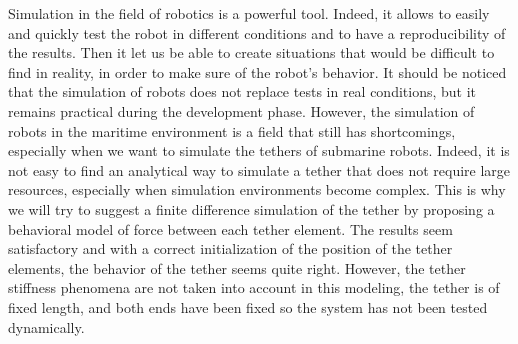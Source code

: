Simulation in the field of robotics is a powerful tool. Indeed, it allows to easily and quickly test the robot in different conditions and to have a reproducibility of the results. Then it let us be able to create situations that would be difficult to find in reality, in order to make sure of the robot's behavior. It should be noticed that the simulation of robots does not replace tests in real conditions, but it remains practical during the development phase. However, the simulation of robots in the maritime environment is a field that still has shortcomings, especially when we want to simulate the tethers of submarine robots. Indeed, it is not easy to find an analytical way to simulate a tether that does not require large resources, especially when simulation environments become complex. This is why we will try to suggest a finite difference simulation of the tether by proposing a behavioral model of force between each tether element. The results seem satisfactory and with a correct initialization of the position of the tether elements, the behavior of the tether seems quite right. However, the tether stiffness phenomena are not taken into account in this modeling, the tether is of fixed length, and both ends have been fixed so the system has not been tested dynamically.